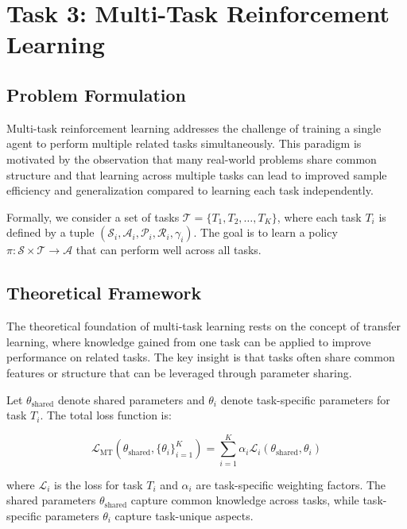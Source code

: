 \documentclass[12pt]{article}
\begin{document}
{{{\section{Task 3: Multi-Task Reinforcement Learning}

\subsection{Problem Formulation}

Multi-task reinforcement learning addresses the challenge of training a single agent to perform multiple related tasks simultaneously. This paradigm is motivated by the observation that many real-world problems share common structure and that learning across multiple tasks can lead to improved sample efficiency and generalization compared to learning each task independently.

Formally, we consider a set of tasks $\mathcal{T} = \{T_1, T_2, \ldots, T_K\}$, where each task $T_i$ is defined by a tuple $(\mathcal{S}_i, \mathcal{A}_i, \mathcal{P}_i, \mathcal{R}_i, \gamma_i)$. The goal is to learn a policy $\pi: \mathcal{S} \times \mathcal{T} \rightarrow \mathcal{A}$ that can perform well across all tasks.

\subsection{Theoretical Framework}

The theoretical foundation of multi-task learning rests on the concept of transfer learning, where knowledge gained from one task can be applied to improve performance on related tasks. The key insight is that tasks often share common features or structure that can be leveraged through parameter sharing.

Let $\theta_{\text{shared}}$ denote shared parameters and $\theta_i$ denote task-specific parameters for task $T_i$. The total loss function is:

\begin{equation}
\mathcal{L}_{\text{MT}}(\theta_{\text{shared}}, \{\theta_i\}_{i=1}^K) = \sum_{i=1}^K \alpha_i \mathcal{L}_i(\theta_{\text{shared}}, \theta_i)
\end{equation}

where $\mathcal{L}_i$ is the loss for task $T_i$ and $\alpha_i$ are task-specific weighting factors. The shared parameters $\theta_{\text{shared}}$ capture common knowledge across tasks, while task-specific parameters $\theta_i$ capture task-unique aspects.

}}}
\end{document}
